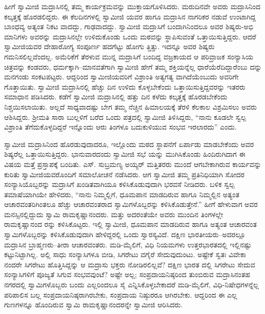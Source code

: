 ಹೀಗೆ ಸ್ವಾಮೀಜಿ ಮದ್ರಾಸಿನಲ್ಲಿ ತಮ್ಮ ಕಾರ್ಯಕ್ರಮವನ್ನು ಮುಕ್ತಾಯಗೊಳಿಸಿದರು. ಮರುದಿನವೇ ಅವರು ಮದ್ರಾಸಿನಿಂದ ಕಲ್ಕತ್ತಕ್ಕೆ ಹೊರಡಲಿದ್ದರು. ಈ ಕೆಲದಿನಗಳಲ್ಲಿ ಸ್ವಾಮೀಜಿ ಯವರ ಹಾಗೂ ಮದ್ರಾಸಿನ ನಾಗರಿಕರ ನಡುವೆ ಉಂಟಾಗಿದ್ದ ಬಾಂಧವ್ಯ ಅತ್ಯಂತ ನಿಕಟ ವಾದದ್ದು, ಗಾಢವಾದದ್ದು. ಸ್ವಾಮೀಜಿ ಮದ್ರಾಸಿಗೆ ಬಂದಾಗಿನಿಂದಲೂ ಅವರ ಶಿಷ್ಯರು-ಅಭಿ ಮಾನಿಗಳು ಅವರನ್ನು ಮದ್ರಾಸಿನಲ್ಲೇ ಉಳಿದುಕೊಂಡು ಒಂದು ಮಠವನ್ನು ಸ್ಥಾಪಿಸುವಂತೆ ಒತ್ತಾಯಿಸುತ್ತಿದ್ದರು. ಆದರೆ ಸ್ವಾಮೀಜಿಯವರ ದೇಹಾರೋಗ್ಯ ಸಂಪೂರ್ಣ ಹದಗೆಟ್ಟು ಹೋಗು ತ್ತಿತ್ತು. ಇದನ್ನೂ ಅವರ ಶಿಷ್ಯರು ಗಮನಿಸಲಿಲ್ಲವೆಂದಲ್ಲ. ಅಮೆರಿಕೆಗೆ ತೆರಳುವ ಮುನ್ನ ಮದ್ರಾಸಿಗೆ ಬಂದಿದ್ದ ವಜ್ರಕಾಯದ ಆ ಪರಿವ್ರಾಜಕ ಸಂನ್ಯಾಸಿಯ ಚಿತ್ರವನ್ನು ಕಂಡವರು, ಧರ್ಮಕ್ಕಾಗಿ–ಮಾನವತೆಗಾಗಿ ಸ್ವಾಮೀಜಿ ಹೇಗೆ ತಮ್ಮ ಶಕ್ತಿಯನ್ನೆಲ್ಲ ಧಾರೆಯೆರೆದಿದ್ದಾರೆಂಬು ದನ್ನು ಮನಗಂಡು ಸಂಕಟಪಟ್ಟರು. ಆದ್ದರಿಂದ ಸ್ವಾಮೀಜಿಯವರಿಗೆ ವಿಶ್ರಾಂತಿ ಅತ್ಯಗತ್ಯ ವಾಗಿದೆಯೆಂಬುದು ಅವರಿಗೇ ಗೊತ್ತಾಯಿತು. ಸ್ವಾಮೀಜಿ ಮದ್ರಾಸಿನಲ್ಲಿ ಹೆಚ್ಚು ದಿನ ಉಳಿದು ಕೊಳ್ಳಬೇಕೆಂದು ಒತ್ತಾಯಿಸುತ್ತಿದ್ದವರನ್ನು ಇತರರು ಸಮಾಧಾನ ಪಡಿಸಿದರು. ಕಡೆಗೆ ಸ್ವಾಮೀಜಿ ಮದ್ರಾಸಿನಲ್ಲಿ ಹತ್ತು ದಿನ ಕಳೆದು ಕಲ್ಕತ್ತಕ್ಕೆ ಹೊರಡಬೇಕೆಂದು ನಿಶ್ಚಯಿಸಲಾಯಿತು. ಅಲ್ಲದೆ ಸಾಧ್ಯವಾದಷ್ಟು ಬೇಗ ತಮ್ಮ ನೆಚ್ಚಿನ ಹಿಮಾಲಯಕ್ಕೆ ತೆರಳಿ ಕೆಲಕಾಲ ವಿಶ್ರಮಿಸಲು ಅವರು ಆಶಿಸಿದ್ದರು. ಶ್ರೀಮತಿ ಸಾರಾ ಬುಲ್ಲಳಿಗೆ ಬರೆದ ಒಂದು ಪತ್ರದಲ್ಲಿ ಸ್ವಾಮೀಜಿ ತಿಳಿಸಿದ್ದರು, “ನಾನು ಕೂಡಲೇ ಸ್ವಲ್ಪ ವಿಶ್ರಾಂತಿ ತೆಗೆದುಕೊಳ್ಳದಿದ್ದರೆ ಇನ್ನೊಂದು ಆರು ತಿಂಗಳೂ ಬದುಕುಳಿಯುವ ಸಂಭವ ಇರಲಾರದು” ಎಂದು.

ಸ್ವಾಮೀಜಿ ಮದ್ರಾಸಿನಿಂದ ಹೊರಡುವುದಾದರೂ, ಇಲ್ಲೊಂದು ಮಠದ ಸ್ಥಾಪನೆಗೆ ಏರ್ಪಾಡು ಮಾಡಬೇಕೆಂದು ಅವರ ಶಿಷ್ಯರೆಲ್ಲ ಒತ್ತಾಯಿಸುತ್ತಿದ್ದರು. ಭಾನುವಾರದಂದು ಸ್ವಾಮೀಜಿ ಸಭೆ ಯನ್ನು ಮುಗಿಸಿಕೊಂಡು ಹಿಂದಿರುಗಿದಾಗ ಈ ವಿಷಯ ಮತ್ತೆ ಪ್ರಸ್ತಾಪಕ್ಕೆ ಬಂದಿತು. ಎಸ್. ಸುಬ್ರಮಣ್ಯ ಅಯ್ಯರ್ ಮತ್ತಿತರರು ಮುಂದೆ ಆಗಬೇಕಾಗಿರುವ ಕಾರ್ಯವನ್ನು ಕುರಿತು ಸ್ವಾಮೀಜಿಯವರೊಂದಿಗೆ ಸಮಾಲೋಚನೆ ನಡೆಸಿದರು. ಆಗ ಸ್ವಾಮೀಜಿ ತಮ್ಮ ಪ್ರತಿನಿಧಿಯಾಗಿ ಸೋದರ ಸಂನ್ಯಾಸಿಯೊಬ್ಬರನ್ನು ಮದ್ರಾಸಿಗೆ ಖಂಡಿತವಾಗಿಯೂ ಕಳಿಸಿಕೊಡುವುದಾಗಿ ಭರವಸೆ ನೀಡಿದರು. ಬಳಿಕ ಸ್ವಲ್ಪ ತಮಾಷೆಯಾಗಿಯೇ ಹೇಳಿದರು, “ನಾನು ನಿಮ್ಮಲ್ಲಿಗೆ, ಧೂಮಪಾನ ಮಾಡದಿರುವ ಹಾಗೂ ನಿಮ್ಮಲ್ಲಿನ ಅತ್ಯಂತ ಆಚಾರವಂತರಿಗಿಂತಲೂ ಹೆಚ್ಚು ಆಚಾರವಂತರಾದ ಸ್ವಾಮಿಗಳೊಬ್ಬರನ್ನು ಕಳಿಸಿಕೊಡುತ್ತೇನೆ.” ಹೀಗೆ ಹೇಳುವಾಗ ಅವರ ಮನಸ್ಸಿನಲ್ಲಿದ್ದುದು ಸ್ವಾಮಿ ರಾಮಕೃಷ್ಣಾನಂದರು. ಮತ್ತು ಅದರಂತೆಯೇ ಅವರು ಮುಂದಿನ ತಿಂಗಳಲ್ಲೇ ರಾಮಕೃಷ್ಣಾನಂದ ರನ್ನು ಕಳಿಸಿಕೊಟ್ಟರು. ಇಲ್ಲಿ ಸ್ವಾಮೀಜಿ, ಧೂಮಪಾನ ಮಾಡದಿರುವ ಹಾಗೂ ಅತ್ಯಂತ ಆಚಾರವಂತ ಸ್ವಾಮಿಗಳೊಬ್ಬರನ್ನು ಕಳಿಸಿಕೊಡುವುದಾಗಿ ಹೇಳಿದ್ದರಲ್ಲಿ ಒಂದು ಸ್ವಾರಸ್ಯವಿದೆ. ದಕ್ಷಿಣ ಭಾರತೀಯರು–ಅದರಲ್ಲೂ ಮದ್ರಾಸಿನ ಬ್ರಾಹ್ಮಣರು–ತೀರಾ ಆಚಾರವಂತರು. ಮಡಿ-ಮೈಲಿಗೆ, ವಿಧಿ ನಿಯಮಗಳು ಉತ್ತರಭಾರತದಲ್ಲಿ ಇಲ್ಲಿನಷ್ಟು ಕಟ್ಟುನಿಟ್ಟಾಗಿಲ್ಲ. ಅಲ್ಲಿ ಸಾಧು ಸಂನ್ಯಾಸಿಗಳೂ ಬೀಡಿ, ಸಿಗರೇಟು ವಗೈರೆ ಸೇದುವುದುಂಟು. ಅಷ್ಟೇಕೆ ಸ್ವತಃ ವಿವೇಕಾ ನಂದರೇ ಸಿಗರೇಟು ಹೊತ್ತಿಸಿದ್ದನ್ನು ಆ ಮದ್ರಾಸು ಭಕ್ತರು ನೋಡಿರಲಿಲ್ಲವೆ? ದಕ್ಷಿಣ ಭಾರತ ದಲ್ಲಿ ಸಿಗರೇಟು ಸೇದುವ ಸಂನ್ಯಾಸಿಗಳಿಗೆ ಪೂಜ್ಯತೆ ಸಿಗುವ ಸಂಭವವುಂಟೆ? ಅಷ್ಟೇ ಅಲ್ಲ; ಸಂಪ್ರದಾಯನಿಷ್ಠರಿಂದ ತುಂಬಿರುವ ಮದ್ರಾಸಿನಂತಹ ನಗರದಲ್ಲಿ ಸ್ವಾಮಿಗಳೊಬ್ಬರು ಬಂದು ಎಲ್ಲರಿಂದಲೂ ಸೈ ಎನ್ನಿಸಿಕೊಳ್ಳಬೇಕಾದರೆ ಮಡಿ-ಮೈಲಿಗೆ, ವಿಧಿ-ನಿಷೇಧಗಳನ್ನೆಲ್ಲ ಪರಿಪಾಲಿಸ ಬಲ್ಲ ಸಂಪ್ರದಾಯನಿಷ್ಠರಾಗಿರಬೇಕು, ಸಂಪ್ರದಾಯ ನಿಷ್ಠುರರೂ ಆಗಿರಬೇಕು. ಆದ್ದರಿಂದ ಈ ಎಲ್ಲ ಗುಣಗಳನ್ನೂ ಹೊಂದಿರುವ ಸ್ವಾಮಿ ರಾಮಕೃಷ್ಣಾನಂದರನ್ನೇ ಸ್ವಾಮೀಜಿ ಆರಿಸಿದರು.


